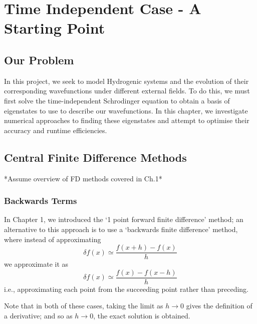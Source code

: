 \chapter{Time Independent Case - A Starting Point} %

\label{Chapter2} %

\section{Our Problem}
In this project, we seek to model Hydrogenic systems and the evolution of their corresponding wavefunctions under different external fields. To do this, we must first solve the time-independent Schrodinger equation to obtain a basis of eigenstates to use to describe our wavefunctions. In this chapter, we investigate numerical approaches to finding these eigenstates and attempt to optimise their accuracy and runtime efficiencies.

\section{Central Finite Difference Methods}
*Assume overview of FD methods covered in Ch.1*
\subsection{Backwards Terms}
In Chapter 1, we introduced the `1 point forward finite difference' method; an alternative to this approach is to use a `backwards finite difference' method, where instead of approximating 
\begin{equation*}
    \delta f\left(x\right) \simeq \frac{f\left(x + h\right) - f\left(x\right)}{h}
\end{equation*}
we approximate it as 
\begin{equation*}
    \delta f\left(x\right) \simeq \frac{f\left(x\right) - f\left(x - h\right)}{h}
\end{equation*}
i.e., approximating each point from the succeeding point rather than preceding. 

Note that in both of these cases, taking the limit as $h\rightarrow 0$ gives the definition of a derivative; and so as $h\rightarrow 0$, the exact solution is obtained.


